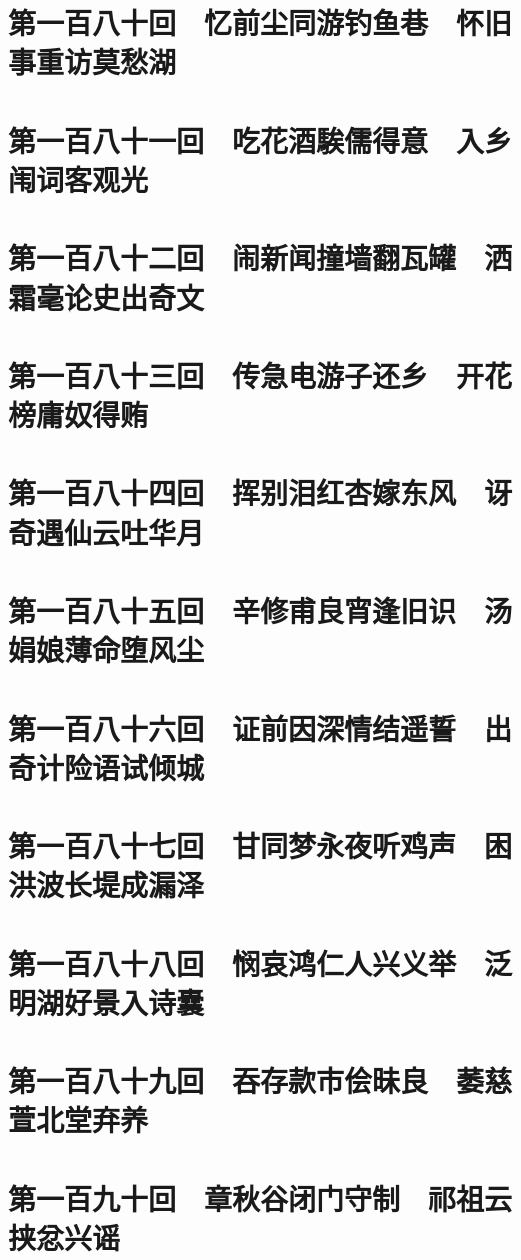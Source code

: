 \documentclass[12pt,UTF8]{ctexbook}
\begin{document}
{{{\chapter{第一百八十回　忆前尘同游钓鱼巷　怀旧事重访莫愁湖}
\chapter{第一百八十一回　吃花酒騃儒得意　入乡闱词客观光}

\chapter{第一百八十二回　闹新闻撞墙翻瓦罐　洒霜毫论史出奇文}

\chapter{第一百八十三回　传急电游子还乡　开花榜庸奴得贿}

\chapter{第一百八十四回　挥别泪红杏嫁东风　讶奇遇仙云吐华月}

\chapter{第一百八十五回　辛修甫良宵逢旧识　汤娟娘薄命堕风尘}

\chapter{第一百八十六回　证前因深情结遥誓　出奇计险语试倾城}

\chapter{第一百八十七回　甘同梦永夜听鸡声　困洪波长堤成漏泽}

\chapter{第一百八十八回　悯哀鸿仁人兴义举　泛明湖好景入诗囊}

\chapter{第一百八十九回　吞存款市侩昧良　萎慈萱北堂弃养}

\chapter{第一百九十回　章秋谷闭门守制　祁祖云挟忿兴谣}

}}}
\end{document}
